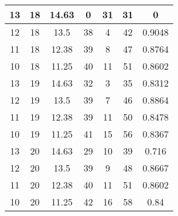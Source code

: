 \documentclass[letterpaper, 12pt]{article}
\begin{document}
\begin{longtable}{|c|c|c|c|c|c|c|}
\hline
13 & 18 & 14.63 & 0 & 31 & 31 & 0 \\
\hline
12 & 18 & 13.5 & 38 & 4 & 42 & 0.9048 \\
\hline
11 & 18 & 12.38 & 39 & 8 & 47 & 0.8764 \\
\hline
10 & 18 & 11.25 & 40 & 11 & 51 & 0.8602 \\
\hline
13 & 19 & 14.63 & 32 & 3 & 35 & 0.8312 \\
\hline
12 & 19 & 13.5 & 39 & 7 & 46 & 0.8864 \\
\hline
11 & 19 & 12.38 & 39 & 11 & 50 & 0.8478 \\
\hline
10 & 19 & 11.25 & 41 & 15 & 56 & 0.8367 \\
\hline
13 & 20 & 14.63 & 29 & 10 & 39 & 0.716 \\
\hline
12 & 20 & 13.5 & 39 & 9 & 48 & 0.8667 \\
\hline
11 & 20 & 12.38 & 40 & 11 & 51 & 0.8602 \\
\hline
10 & 20 & 11.25 & 42 & 16 & 58 & 0.84 \\
\hline
\end{longtable}
\end{document}
